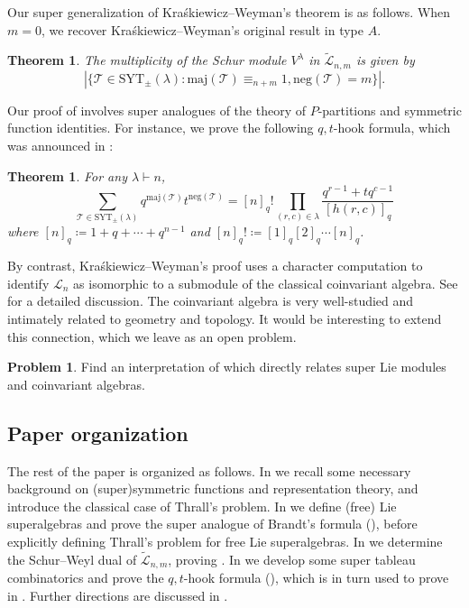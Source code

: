\documentclass[11pt]{article}
\newtheorem{thm}[theo]{Theorem}
\theoremstyle{definition}
\newtheorem{prob}[theo]{Problem}
\numberwithin{equation}{section}
\newcommand\maj{\mathrm{maj}}
\newcommand\negg{\mathrm{neg}}
\newcommand\SYT{\mathrm{SYT}}
\newcommand\Lcal{\mathcal{L}}
\newcommand\Ltil{\widetilde{\mathcal{L}}}
\begin{document}
Our super generalization of Kra{\'s}kiewicz--Weyman's theorem is as follows. When $m=0$, we recover Kra{\'s}kiewicz--Weyman's original result \cite{KW} in type $A$.
\begin{thm}\label{thm:super-KW}
    The multiplicity of the Schur module $V^\lambda$ in $\Ltil_{n,m}$ is given by
    \begin{equation}\label{eq:super-KW}
        |\{ \mathcal{T} \in \SYT_\pm(\lambda) : \maj(\mathcal{T}) \equiv_{n+m} 1, \negg(\mathcal{T}) = m \}|.
    \end{equation}
\end{thm}

Our proof of  involves super analogues of the theory of $P$-partitions and symmetric function identities. For instance, we prove the following $q,t$-hook formula, which was announced in \cite[(6.1)]{BS}:
\begin{thm}\label{thm:maj-neg-hook}
    For any $\lambda \vdash n$,
    \begin{equation}\label{eq:maj-neg-hook}
        \sum_{\mathcal{T} \in \SYT_\pm(\lambda)} q^{\maj(\mathcal{T})} t^{\negg(\mathcal{T})} = [n]_q! \prod_{(r, c) \in \lambda} \frac{q^{r-1} + tq^{c-1}}{[h(r, c)]_q}
    \end{equation}
    where $[n]_q \coloneqq 1 + q + \cdots + q^{n-1}$ and $[n]_q! \coloneqq [1]_q[2]_q \cdots [n]_q$.
\end{thm}

By contrast, Kra{\'s}kiewicz--Weyman's proof uses a character computation to identify $\Lcal_n$ as isomorphic to a submodule of the classical coinvariant algebra. See \cite[\S 8]{Gar} for a detailed discussion. The coinvariant algebra is very well-studied and intimately related to geometry and topology. It would be interesting to extend this connection, which we leave as an open problem.
\begin{prob}
    Find an interpretation of  which directly relates super Lie modules and coinvariant algebras.
\end{prob}

\subsection{Paper organization}
 The rest of the paper is organized as follows. In  we recall some necessary background on (super)symmetric functions and representation theory, and introduce the classical case of Thrall's problem. In  we define (free) Lie superalgebras and prove the super analogue of Brandt's formula (), before explicitly defining Thrall's problem for free Lie superalgebras. In  we determine the Schur--Weyl dual of $\Ltil_{n,m}$, proving . In  we develop some super tableau combinatorics and prove the $q,t$-hook formula (), which is in turn used to prove  in . Further directions are discussed in .
\end{document}
